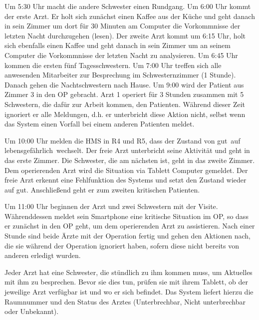 Um 5:30 Uhr macht die andere Schwester einen Rundgang. Um 6:00 Uhr kommt der erste Arzt. Er holt sich zunächst einen Kaffee aus der Küche und geht danach in sein Zimmer  um dort für 30 Minuten am Computer die Vorkommnisse der letzten Nacht durchzugehen (lesen). Der zweite Arzt kommt um 6:15 Uhr, holt sich ebenfalls einen Kaffee und geht danach in sein Zimmer um an seinem Computer die Vorkommnisse der letzten Nacht zu analysieren. Um 6:45 Uhr kommen die ersten fünf Tagesschwestern. Um 7:00 Uhr treffen sich alle anwesenden Mitarbeiter zur Besprechung im Schwesternzimmer (1 Stunde). Danach gehen die Nachtschwestern nach Hause. Um 9:00 wird der Patient aus Zimmer 3 in den OP gebracht. Arzt 1 operiert für 3 Stunden zusammen mit 5 Schwestern, die dafür zur Arbeit kommen, den Patienten. Während dieser Zeit ignoriert er alle Meldungen, d.h. er unterbricht diese Aktion nicht, selbst wenn das System einen Vorfall bei einem anderen Patienten meldet.

Um 10:00 Uhr melden die HMS in R4 und R5, dass der Zustand von \glqq gut\grqq\ auf \glqq lebensgefährlich\grqq\ wechselt. Der freie Arzt unterbricht seine Aktivität und geht in das erste Zimmer. Die Schwester, die am nächsten ist, geht in das zweite Zimmer. Dem operierenden Arzt wird die Situation via Tablett Computer gemeldet. Der freie Arzt erkennt eine Fehlfunktion des Systems und setzt den Zustand wieder auf \glqq gut\grqq. Anschließend geht er zum zweiten kritischen Patienten. 

Um 11:00 Uhr beginnen der Arzt und zwei Schwestern mit der Visite. Währenddessen meldet sein Smartphone eine kritische Situation im OP, so dass er zunächst in den OP geht, um dem operierenden Arzt zu assistieren. Nach einer Stunde sind beide Ärzte mit der Operation fertig und gehen den Aktionen nach, die sie während der Operation ignoriert haben, sofern diese nicht bereits von anderen erledigt wurden.

Jeder Arzt hat eine Schwester, die stündlich zu ihm kommen muss, um Aktuelles mit ihm zu besprechen. Bevor sie dies tun, prüfen sie mit ihrem Tablett, ob der jeweilige Arzt verfügbar ist und wo er sich befindet. Das System liefert hierzu die Raumnummer und den Status des Arztes (Unterbrechbar, Nicht unterbrechbar oder Unbekannt).


